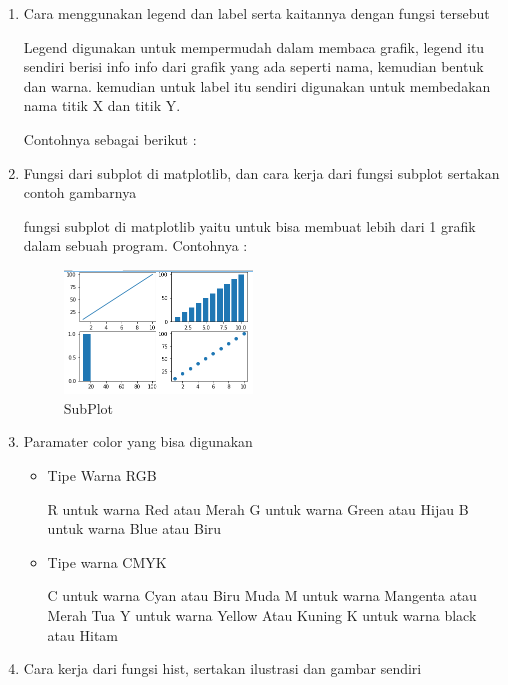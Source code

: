 \begin{enumerate}
\begin{itemize}
\end{itemize}

\item Cara menggunakan legend dan label serta kaitannya dengan fungsi tersebut

Legend digunakan untuk mempermudah dalam membaca grafik, legend itu sendiri berisi info info dari grafik yang ada seperti nama, kemudian bentuk dan warna.
kemudian untuk label itu sendiri digunakan untuk membedakan nama titik X dan titik Y.

Contohnya sebagai berikut :


\item Fungsi dari subplot di matplotlib, dan cara kerja dari fungsi subplot sertakan contoh gambarnya

fungsi subplot di matplotlib yaitu untuk bisa membuat lebih dari 1 grafik dalam sebuah program.
Contohnya :


\begin{figure}[H]	
    \includegraphics[width=5cm]{figures/6/1174069/Teori/chart.png}
    \centering
    \caption{SubPlot}
\end{figure}

\item Paramater color yang bisa digunakan

\begin{itemize}
    \item Tipe Warna RGB

    R untuk warna Red atau Merah
    G untuk warna Green atau Hijau
    B untuk warna Blue atau Biru
    \item Tipe warna CMYK

    C untuk warna Cyan atau Biru Muda
    M untuk warna Mangenta atau Merah Tua
    Y untuk warna Yellow Atau Kuning
    K untuk warna black atau Hitam
\end{itemize}

\item Cara kerja dari fungsi hist, sertakan ilustrasi dan gambar sendiri


\end{enumerate}

